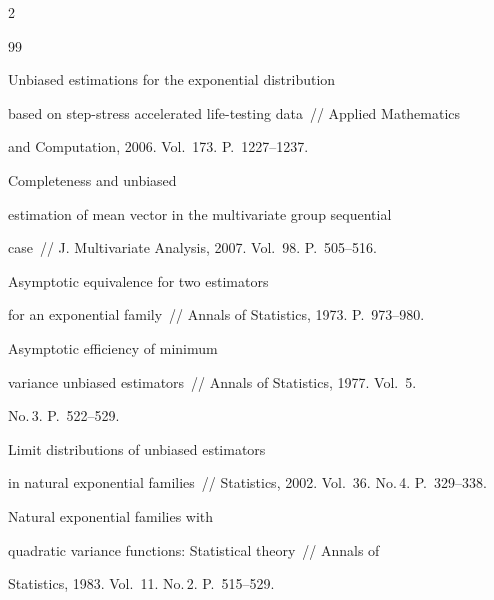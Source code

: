 \begin{multicols}{2}
{{\begin{thebibliography}{99}






Unbiased estimations for the exponential distribution


 based on step-stress accelerated life-testing data~// Applied Mathematics


 and Computation, 2006. Vol.~173. P.~1227--1237.








Completeness and unbiased


estimation of mean vector in the multivariate group sequential


case~// J. Multivariate Analysis, 2007. Vol.~98. P.~505--516.








Asymptotic equivalence for two estimators


for an exponential family~// Annals of Statistics, 1973. P.~973--980.








Asymptotic efficiency of minimum


variance unbiased estimators~// Annals of Statistics, 1977. Vol.~5.


No.\,3. P.~522--529.








Limit distributions of unbiased estimators


in natural exponential families~// Statistics, 2002. Vol.~36. No.\,4. P.~329--338.








Natural exponential families with


quadratic variance functions: Statistical theory~//  Annals of


Statistics, 1983. Vol.~11. No.\,2. P.~515--529.








\end{thebibliography}}}
\end{multicols}
